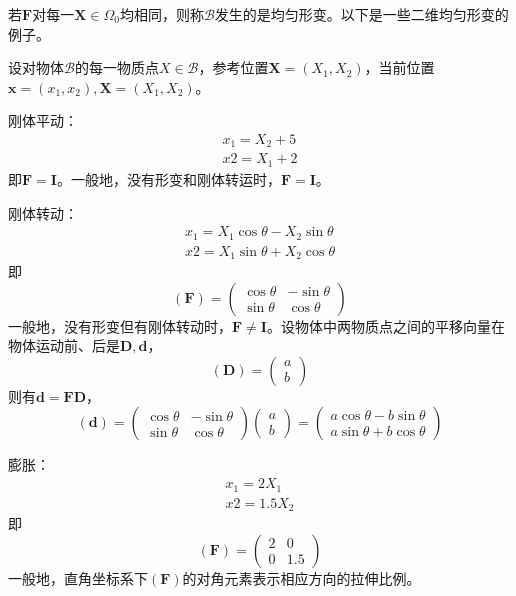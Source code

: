 \documentclass[main.tex]{subfiles}
\begin{document}
若$\mathbf{F}$对每一$\mathbf{X}\in\Omega_0$均相同，则称$\mathcal{B}$发生的是均匀形变。以下是一些二维均匀形变的例子。
\begin{example}
设对物体$\mathcal{B}$的每一物质点$X\in\mathcal{B}$，参考位置$\mathbf{X}=\left(X_1,X_2\right)$，当前位置$\mathbf{x}=\left(x_1,x_2\right),\mathbf{X}=\left(X_1,X_2\right)$。

刚体平动：
\[\begin{array}{l}
x_1=X_2+5\\
x2=X_1+2
\end{array}\]
即$\mathbf{F}=\mathbf{I}$。一般地，没有形变和刚体转运时，$\mathbf{F}=\mathbf{I}$。

刚体转动：
\[\begin{array}{l}
x_1=X_1\cos\theta-X_2\sin\theta\\
x2=X_1\sin\theta+X_2\cos\theta
\end{array}\]
即
\[\left(\mathbf{F}\right)=\left(\begin{array}{cc}
\cos\theta&-\sin\theta\\
\sin\theta&\cos\theta\end{array}\right)\]
一般地，没有形变但有刚体转动时，$\mathbf{F}\neq\mathbf{I}$。设物体中两物质点之间的平移向量在物体运动前、后是$\mathbf{D},\mathbf{d}$，
\[\left(\mathbf{D}\right)=\left(\begin{array}{c}a\\b\end{array}\right)\]
则有$\mathbf{d}=\mathbf{FD}$，
\[\left(\mathbf{d}\right)=\left(\begin{array}{cc}
\cos\theta&-\sin\theta\\
\sin\theta&\cos\theta\end{array}\right)\left(\begin{array}{c}a\\b\end{array}\right)=\left(\begin{array}{c}a\cos\theta-b\sin\theta\\a\sin\theta+b\cos\theta\end{array}\right)\]

膨胀：
\[\begin{array}{l}
x_1=2X_1\\
x2=1.5X_2
\end{array}\]
即
\[\left(\mathbf{F}\right)=\left(\begin{array}{cc}2&0\\0&1.5\end{array}\right)\]
一般地，直角坐标系下$\left(\mathbf{F}\right)$的对角元素表示相应方向的拉伸比例。


\end{example}
\end{document}
